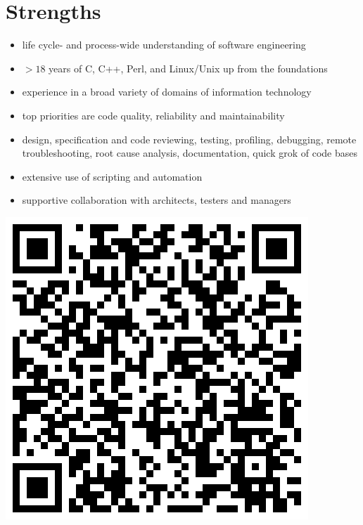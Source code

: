 \documentclass[a4paper,12pt]{article}
\newcommand{\compress}{\setlength\itemsep{-\parskip}}
\newenvironment{compressedItemize}{\begin{itemize}\compress}{\end{itemize}}
\begin{document}
\section{Strengths}

\begin{minipage}[b]{0.79\textwidth}
\begin{compressedItemize}
\item	life cycle- and process-wide understanding of software engineering
\item	$>18$ years of C, C++, Perl, and Linux/Unix up from the foundations
\item	experience in a broad variety of domains of information technology
\item	top priorities are code quality, reliability and maintainability
\item	design, specification and code reviewing, testing, profiling,
	debugging, remote \\ troubleshooting, root cause analysis,
	documentation,
	quick grok of code bases
\item	extensive use of scripting and automation
\item	supportive collaboration with architects, testers and managers
\end{compressedItemize}
\end{minipage}
\parbox[t]{0.20\textwidth}{\includegraphics[scale=0.25,clip=false]{qrcode}}
\end{document}
